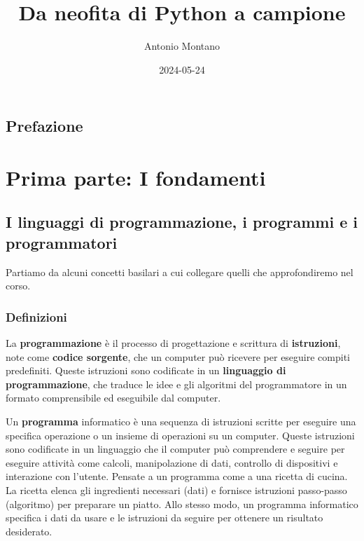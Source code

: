 \documentclass[
  letterpaper,
]{scrbook}
\title{Da neofita di Python a campione}
\author{Antonio Montano}
\date{2024-05-24}
\renewcommand*\contentsname{Indice}
\newcommand\contentsname{Indice}
\begin{document}
\frontmatter
\maketitle

\renewcommand*\contentsname{Indice}
{
\setcounter{tocdepth}{2}
\tableofcontents
}
\mainmatter
{}

\chapter*{Prefazione}\label{prefazione}


\part{Prima parte: I fondamenti}

\chapter{I linguaggi di programmazione, i programmi e i
programmatori}\label{i-linguaggi-di-programmazione-i-programmi-e-i-programmatori}

Partiamo da alcuni concetti basilari a cui collegare quelli che
approfondiremo nel corso.

\section{Definizioni}\label{definizioni}

La \textbf{programmazione} è il processo di progettazione e scrittura di
\textbf{istruzioni}, note come \textbf{codice sorgente}, che un computer
può ricevere per eseguire compiti predefiniti. Queste istruzioni sono
codificate in un \textbf{linguaggio di programmazione}, che traduce le
idee e gli algoritmi del programmatore in un formato comprensibile ed
eseguibile dal computer.

Un \textbf{programma} informatico è una sequenza di istruzioni scritte
per eseguire una specifica operazione o un insieme di operazioni su un
computer. Queste istruzioni sono codificate in un linguaggio che il
computer può comprendere e seguire per eseguire attività come calcoli,
manipolazione di dati, controllo di dispositivi e interazione con
l'utente. Pensate a un programma come a una ricetta di cucina. La
ricetta elenca gli ingredienti necessari (dati) e fornisce istruzioni
passo-passo (algoritmo) per preparare un piatto. Allo stesso modo, un
programma informatico specifica i dati da usare e le istruzioni da
seguire per ottenere un risultato desiderato.
\end{document}
